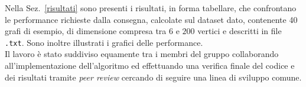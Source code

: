 Nella Sez.~\ref{risultati} sono presenti i risultati, in forma tabellare, che confrontano le performance richieste dalla consegna, calcolate sul dataset dato, contenente 40 grafi di esempio, di dimensione compresa tra $6$ e $200$ vertici e descritti in file \texttt{.txt}.
Sono inoltre illustrati i grafici delle performance.\\
Il lavoro è stato suddiviso equamente tra i membri del gruppo collaborando all'implementazione dell'algoritmo ed effettuando una verifica finale del codice e dei risultati tramite \textit{peer review} cercando di seguire una linea di sviluppo comune.
\pagebreak

